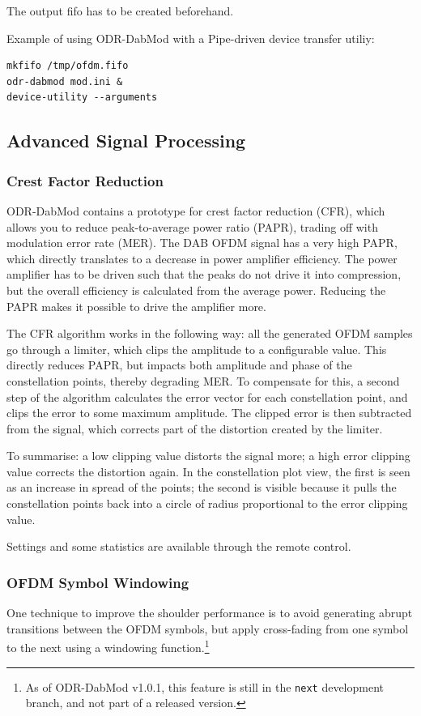 The output fifo has to be created beforehand.

Example of using ODR-DabMod with a Pipe-driven device transfer utiliy:

\begin{lstlisting}
mkfifo /tmp/ofdm.fifo
odr-dabmod mod.ini &
device-utility --arguments
\end{lstlisting}


\subsection{Advanced Signal Processing}
\subsubsection{Crest Factor Reduction}
ODR-DabMod contains a prototype for crest factor reduction (CFR), which allows you to
reduce peak-to-average power ratio (PAPR), trading off with modulation error
rate (MER). The DAB OFDM signal has a very high PAPR, which directly translates
to a decrease in power amplifier efficiency. The power amplifier has to be
driven such that the peaks do not drive it into compression, but the overall
efficiency is calculated from the average power.
Reducing the PAPR makes it possible to drive the amplifier more.

The CFR algorithm works in the following way: all the generated OFDM samples go
through a limiter, which clips the amplitude to a configurable value. This
directly reduces PAPR, but impacts both amplitude and phase of the constellation
points, thereby degrading MER. To compensate for this, a second step of the
algorithm calculates the error vector for each constellation point, and clips
the error to some maximum amplitude. The clipped error is then subtracted from
the signal, which corrects part of the distortion created by the limiter.

To summarise: a low clipping value distorts the signal more; a high error
clipping value corrects the distortion again.
In the constellation plot view, the first is seen as an increase in spread of
the points; the second is visible because it pulls the constellation points back
into a circle of radius proportional to the error clipping value.

Settings and some statistics are available through the remote control.

\subsubsection{OFDM Symbol Windowing}
One technique to improve the shoulder performance is to avoid generating abrupt
transitions between the OFDM symbols, but apply cross-fading from one symbol to
the next using a windowing function.\footnote{As of ODR-DabMod v1.0.1, this feature is
still in the \texttt{next} development branch, and not part of a released
version.}

